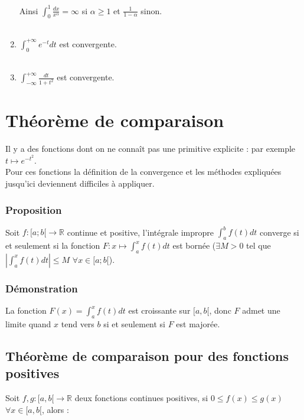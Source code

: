 \documentclass[a4paper,10pt]{book} %
\newcommand{\R}{\mathbb{R}}
\newcommand{\abs}[1]{\left|#1\right|}
\newcommand{\displayAmath}{\displaystyle}
\begin{document}
\begin{enumerate}
Ainsi $\displayAmath\int_0^1\frac{dx}{x^\alpha}=\infty$ si $\alpha\geq 1$ et $\frac{1}{1-\alpha}$ sinon.\\\\

\item $\displayAmath\int_0^{+\infty}e^{-t}dt$ est convergente.\\\\

\item $\displayAmath\int_{-\infty}^{+\infty}\frac{dt}{1+t^2}$ est convergente.
\end{enumerate}

\section{Théorème de comparaison}
Il y a des fonctions dont on ne connaît pas une primitive explicite : par exemple $t\mapsto e^{-t^2}$.\\

Pour ces fonctions la définition de la convergence et les méthodes expliquées jusqu'ici deviennent difficiles à appliquer.

\subsubsection{Proposition}\label{propIntegrImpropre}
Soit $f:[a;b[\rightarrow \R$ continue et positive, l'intégrale impropre $\displayAmath\int_{a}^{b}f(t)dt$ converge si et seulement si la fonction $\displayAmath F:x\mapsto\int_a^xf(t)dt$ est bornée ($\displayAmath\exists M>0$ tel que $\displayAmath\abs{\int_{a}^{x}f(t)dt}\leq M$ $\forall x\in [a;b[$).

\subsubsection{Démonstration}
La fonction $\displayAmath F(x)=\int_a^xf(t)dt$ est croissante sur $[a,b[$, donc $F$ admet une limite quand $x$ tend vers $b$ si et seulement si $F$ est majorée.

\newpage

\subsection{Théorème de comparaison pour des fonctions positives}
Soit $f,g:[a,b[\rightarrow \R$ deux fonctions continues positives, si $0\leq f(x)\leq g(x)$ ~$\forall x\in[a,b[$, alors :
\end{document}
